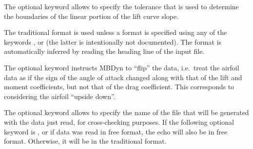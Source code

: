 The optional keyword  allows to specify the tolerance
that is used to determine the boundaries of the linear portion
of the lift curve slope.

The traditional format is used unless a format is specified using any
of the keywords ,  or 
(the latter is intentionally not documented).
The format is automatically inferred by reading the heading line
of the input file.

The optional keyword  instructs MBDyn to ``flip'' the data,
i.e.\ treat the airfoil data as if the sign of the angle of attack
changed along with that of the lift and moment coefficients,
but not that of the drag coefficient.
This corresponds to considering the airfoil ``upside down''.

The optional keyword  allows to specify the name of the file
that will be generated with the data just read, for cross-checking purposes.
If the following optional keyword is , or if data was read
in free format, the echo will also be in free format.
Otherwise, it will be in the traditional format.

